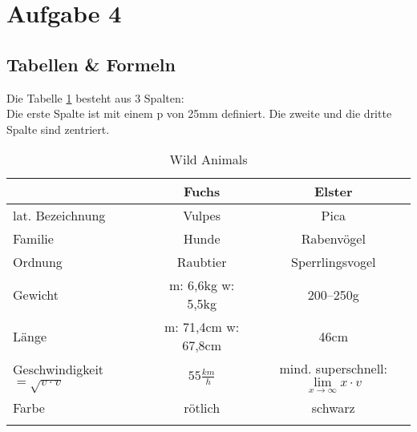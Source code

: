 \section{Aufgabe 4}
\subsection{Tabellen \& Formeln}
Die Tabelle \ref{tab:ani} besteht aus 3 Spalten:\\
Die erste Spalte ist mit einem p von 25mm definiert. Die zweite und die dritte Spalte sind zentriert.

\begin{longtable}{p{25mm}|c|c}
& Fuchs & Elster\\
\hline
lat. Bezeichnung & Vulpes & Pica\\
\hline
Familie & Hunde & Rabenvögel\\
\hline
Ordnung & Raubtier & Sperrlingsvogel\\
\hline
Gewicht & m: 6,6kg w: 5,5kg & 200--250g\\
\hline
Länge  & m: 71,4cm w: 67,8cm & 46cm\\
\hline
Geschwindigkeit $ = \sqrt{v\cdot v}$ & $55\frac{km}{h}$ & mind. superschnell: $\lim\limits_{x \rightarrow \infty} x \cdot v$ \\
\hline
Farbe & rötlich & schwarz\\
\hline
\caption{Wild Animals}
\label{tab:ani}
\end{longtable}

